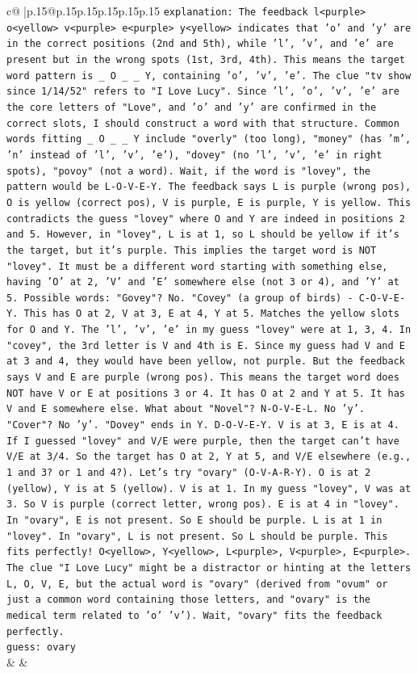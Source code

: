 \documentclass{article}
\begin{document}
{\begin{supertabular}{c@{$\;$}|p{.15\linewidth}@{}p{.15\linewidth}p{.15\linewidth}p{.15\linewidth}p{.15\linewidth}p{.15\linewidth}}
{{{                \texttt{explanation: The feedback l<purple> o<yellow> v<purple> e<purple> y<yellow> indicates that 'o' and 'y' are in the correct positions (2nd and 5th), while 'l', 'v', and 'e' are present but in the wrong spots (1st, 3rd, 4th). This means the target word pattern is \_ O \_ \_ Y, containing 'o', 'v', 'e'. The clue "tv show since 1/14/52" refers to "I Love Lucy". Since 'l', 'o', 'v', 'e' are the core letters of "Love", and 'o' and 'y' are confirmed in the correct slots, I should construct a word with that structure. Common words fitting \_ O \_ \_ Y include "overly" (too long), "money" (has 'm', 'n' instead of 'l', 'v', 'e'), "dovey" (no 'l', 'v', 'e' in right spots), "povoy" (not a word). Wait, if the word is "lovey", the pattern would be L{-}O{-}V{-}E{-}Y. The feedback says L is purple (wrong pos), O is yellow (correct pos), V is purple, E is purple, Y is yellow. This contradicts the guess "lovey" where O and Y are indeed in positions 2 and 5. However, in "lovey", L is at 1, so L should be yellow if it's the target, but it's purple. This implies the target word is NOT "lovey". It must be a different word starting with something else, having 'O' at 2, 'V' and 'E' somewhere else (not 3 or 4), and 'Y' at 5. Possible words: "Govey"? No. "Covey" (a group of birds) {-} C{-}O{-}V{-}E{-}Y. This has O at 2, V at 3, E at 4, Y at 5. Matches the yellow slots for O and Y. The 'l', 'v', 'e' in my guess "lovey" were at 1, 3, 4. In "covey", the 3rd letter is V and 4th is E. Since my guess had V and E at 3 and 4, they would have been yellow, not purple. But the feedback says V and E are purple (wrong pos). This means the target word does NOT have V or E at positions 3 or 4. It has O at 2 and Y at 5. It has V and E somewhere else. What about "Novel"? N{-}O{-}V{-}E{-}L. No 'y'. "Cover"? No 'y'. "Dovey" ends in Y. D{-}O{-}V{-}E{-}Y. V is at 3, E is at 4. If I guessed "lovey" and V/E were purple, then the target can't have V/E at 3/4. So the target has O at 2, Y at 5, and V/E elsewhere (e.g., 1 and 3? or 1 and 4?). Let's try "ovary" (O{-}V{-}A{-}R{-}Y). O is at 2 (yellow), Y is at 5 (yellow). V is at 1. In my guess "lovey", V was at 3. So V is purple (correct letter, wrong pos). E is at 4 in "lovey". In "ovary", E is not present. So E should be purple. L is at 1 in "lovey". In "ovary", L is not present. So L should be purple. This fits perfectly! O<yellow>, Y<yellow>, L<purple>, V<purple>, E<purple>. The clue "I Love Lucy" might be a distractor or hinting at the letters L, O, V, E, but the actual word is "ovary" (derived from "ovum" or just a common word containing those letters, and "ovary" is the medical term related to 'o' 'v'). Wait, "ovary" fits the feedback perfectly.} \\
\texttt{guess: ovary} \\
            }
        }
    }
    & & \\ \\


\end{supertabular}}
\end{document}
